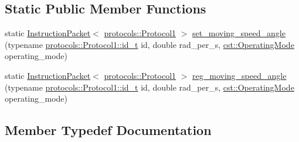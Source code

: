 \subsection*{Static Public Member Functions}
\begin{DoxyCompactItemize}
\item 
static \hyperlink{classdynamixel_1_1_instruction_packet}{Instruction\+Packet}$<$ \hyperlink{classdynamixel_1_1protocols_1_1_protocol1}{protocols\+::\+Protocol1} $>$ \hyperlink{classdynamixel_1_1servos_1_1_protocol_specific_packets_3_01_m_00_01protocols_1_1_protocol1_01_4_a7fa274b26149b617e54d490cc04db7d3}{set\+\_\+moving\+\_\+speed\+\_\+angle} (typename \hyperlink{classdynamixel_1_1protocols_1_1_protocol1_a1d4dfa22b01f80b1876d14f539d52b5c}{protocols\+::\+Protocol1\+::id\+\_\+t} id, double rad\+\_\+per\+\_\+s, \hyperlink{namespacedynamixel_1_1servos_1_1cst_ac17b5608f65c6495114d34f8efc4d809}{cst\+::\+Operating\+Mode} operating\+\_\+mode)
\item 
static \hyperlink{classdynamixel_1_1_instruction_packet}{Instruction\+Packet}$<$ \hyperlink{classdynamixel_1_1protocols_1_1_protocol1}{protocols\+::\+Protocol1} $>$ \hyperlink{classdynamixel_1_1servos_1_1_protocol_specific_packets_3_01_m_00_01protocols_1_1_protocol1_01_4_ab508a51888831c33bbd24dc05d8b2f99}{reg\+\_\+moving\+\_\+speed\+\_\+angle} (typename \hyperlink{classdynamixel_1_1protocols_1_1_protocol1_a1d4dfa22b01f80b1876d14f539d52b5c}{protocols\+::\+Protocol1\+::id\+\_\+t} id, double rad\+\_\+per\+\_\+s, \hyperlink{namespacedynamixel_1_1servos_1_1cst_ac17b5608f65c6495114d34f8efc4d809}{cst\+::\+Operating\+Mode} operating\+\_\+mode)
\end{DoxyCompactItemize}


\subsection{Member Typedef Documentation}
\hypertarget{classdynamixel_1_1servos_1_1_protocol_specific_packets_3_01_m_00_01protocols_1_1_protocol1_01_4_aaf41bdc8c76f4b48435902cb819a9912}{}
